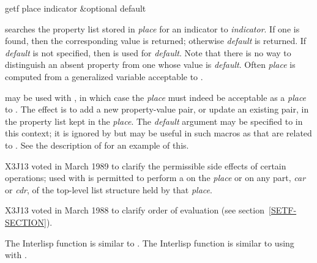 \begin{defun}[Function]
getf place indicator &optional default

 searches the property list stored in \emph{place}
for an indicator  to \emph{indicator}.
If one is found, then the corresponding value is returned;
otherwise \emph{default} is returned.  If \emph{default} is not specified,
then {\false} is used for \emph{default}.
Note that there is no way to distinguish an absent property from
one whose value is \emph{default}.
Often \emph{place} is computed from
a generalized variable acceptable to .

 may be used with , in which case the \emph{place} must
indeed be acceptable as a \emph{place} to .  The effect is to
add a new property-value pair, or update an existing pair,
in the property list kept in the \emph{place}.
The \emph{default} argument may be
specified to  in this context; it is ignored by  but
may be useful in such macros as  that are related to .
See the description of  for an example of this.

\begin{newer}
X3J13 voted in March 1989 
to clarify the permissible side effects of certain operations;
 used with  is permitted to perform a 
on the \emph{place} or on any part, \emph{car} or \emph{cdr}, of the
top-level list structure held by that \emph{place}.
\end{newer}

\begin{newer}
X3J13 voted in March 1988 
to clarify order of evaluation (see section~\ref{SETF-SECTION}).
\end{newer}

\beforenoterule
\begin{incompatibility}
The Interlisp function  is similar to .
The Interlisp function  is similar to using 
with .
\end{incompatibility}
\afternoterule
\end{defun}


